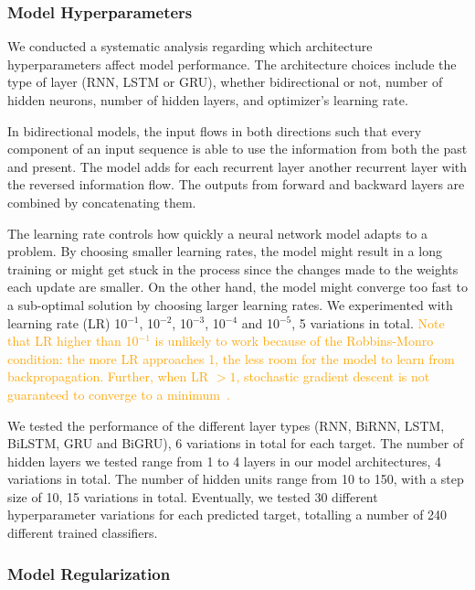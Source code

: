\documentclass[sn-mathphys, pdflatex]{sn-jnl}
\newcommand{\rev}[1]{\textcolor{orange}{#1}}
\begin{document}
\subsubsection{Model Hyperparameters}

We conducted a systematic analysis regarding which architecture hyperparameters affect model performance.
The architecture choices include the type of layer (RNN, LSTM or GRU),
whether bidirectional or not, number of hidden neurons, number of hidden layers, and optimizer's learning rate.

In bidirectional models, the input flows in both directions
such that every component of an input sequence is able to use the information from both the past and present.
The model adds for each recurrent layer another recurrent layer with the reversed information flow.
The outputs from forward and backward layers are combined by concatenating them.

The learning rate controls how quickly a neural network model adapts to a problem.
By choosing smaller learning rates, the model might result in a long training or might get stuck in the process
since the changes made to the weights each update are smaller.
On the other hand, the model might converge too fast to a sub-optimal solution by choosing larger learning rates.
We experimented with learning rate (LR) 10$^{-1}$, 10$^{-2}$, 10$^{-3}$, 10$^{-4}$ and 10$^{-5}$, 5 variations in total.
\rev{
Note that LR higher than 10$^{-1}$ is unlikely to work because of the Robbins-Monro condition:
the more LR approaches 1, the less room for the model to learn from backpropagation.
Further, when LR $> 1$, stochastic gradient descent is not guaranteed to converge to a minimum~\cite{Ranganath14}.
}

We tested the performance of the different layer types (RNN, BiRNN, LSTM, BiLSTM, GRU and BiGRU), 6 variations in total for each target.
The number of hidden layers we tested range from 1 to 4 layers in our model architectures, 4 variations in total.
The number of hidden units range from 10 to 150, with a step size of 10, 15 variations in total.
Eventually, we tested 30 different hyperparameter variations for each predicted target,
totalling a number of 240 different trained classifiers.

\subsubsection{Model Regularization}
\end{document}
